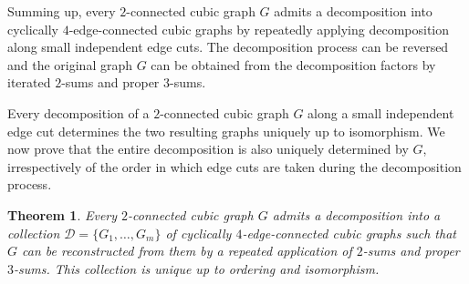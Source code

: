 \documentclass[a4paper]{amsart}
\theoremstyle{plain}
\newtheorem{theorem}{Theorem}[section]
\theoremstyle{definition}
\begin{document}
Summing up, every $2$-connected cubic graph $G$ admits a
decomposition into cyclically $4$-edge-connected cubic graphs
by repeatedly applying decomposition along small independent
edge cuts. The decomposition process can be reversed and the
original graph $G$ can be obtained from the decomposition
factors by iterated $2$-sums and proper $3$-sums.

Every decomposition of a $2$-connected cubic graph $G$
along a small independent edge cut determines the two resulting
graphs uniquely up to isomorphism. We now prove that the entire
decomposition is also uniquely determined by $G$,
irrespectively of the order in which edge cuts are taken during
the decomposition process.

\begin{theorem}\label{thm:decomposition}
Every $2$-connected cubic graph $G$ admits a decomposition into
a collection $\mathcal{D}=\{G_1,\ldots,G_m\}$ of cyclically
$4$-edge-connected cubic graphs such that $G$ can be
reconstructed from them by a repeated application of $2$-sums
and proper $3$-sums. This collection is unique
up to ordering and isomorphism.
\end{theorem}
\end{document}
